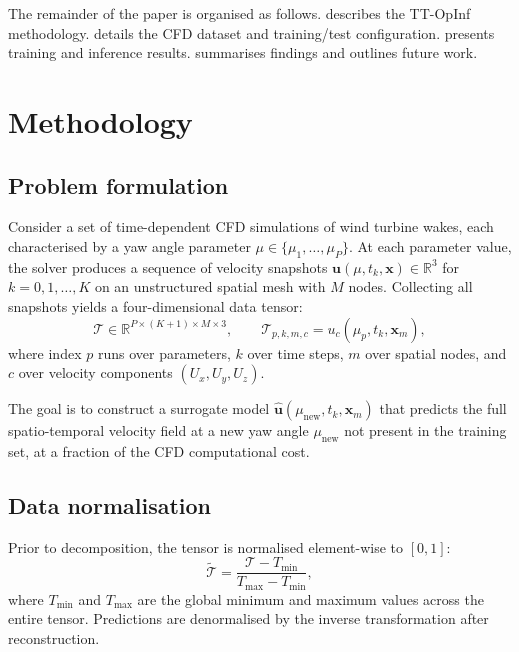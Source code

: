 \documentclass[12pt]{article}
\newcommand{\R}{\mathbb{R}}
\newcommand{\tensor}[1]{\boldsymbol{\mathcal{#1}}}
\newcommand{\vect}[1]{\mathbf{#1}}
\begin{document}
The remainder of the paper is organised as follows.
 describes the TT-OpInf methodology.
 details the CFD dataset and training/test configuration.
 presents training and inference results.
 summarises findings and outlines future work.


\section{Methodology}
\label{sec:methodology}

\subsection{Problem formulation}
\label{sec:problem}

Consider a set of time-dependent CFD simulations of wind turbine wakes, each characterised by a yaw angle parameter $\mu \in \{\mu_1, \dots, \mu_P\}$.
At each parameter value, the solver produces a sequence of velocity snapshots $\vect{u}(\mu, t_k, \vect{x}) \in \R^3$ for $k = 0, 1, \dots, K$ on an unstructured spatial mesh with $M$ nodes.
Collecting all snapshots yields a four-dimensional data tensor:
\begin{equation}
\label{eq:tensor4d}
    \tensor{T} \in \R^{P \times (K+1) \times M \times 3}, \qquad
    \tensor{T}_{p,k,m,c} = u_c(\mu_p, t_k, \vect{x}_m),
\end{equation}
where index $p$ runs over parameters, $k$ over time steps, $m$ over spatial nodes, and $c$ over velocity components $(U_x, U_y, U_z)$.

The goal is to construct a surrogate model $\hat{\vect{u}}(\mu_{\text{new}}, t_k, \vect{x}_m)$ that predicts the full spatio-temporal velocity field at a new yaw angle $\mu_{\text{new}}$ not present in the training set, at a fraction of the CFD computational cost.

\subsection{Data normalisation}
\label{sec:normalisation}

Prior to decomposition, the tensor is normalised element-wise to $[0,1]$:
\begin{equation}
    \tilde{\tensor{T}} = \frac{\tensor{T} - T_{\min}}{T_{\max} - T_{\min}},
\end{equation}
where $T_{\min}$ and $T_{\max}$ are the global minimum and maximum values across the entire tensor.
Predictions are denormalised by the inverse transformation after reconstruction.
\end{document}
